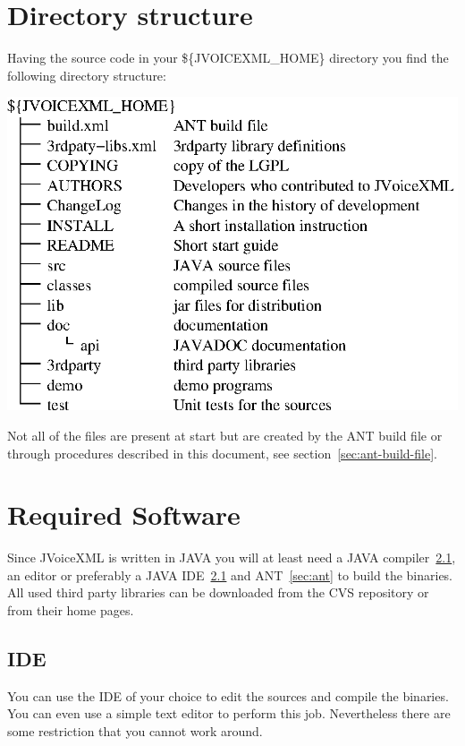 \documentclass[11pt,a4paper]{article}
\begin{document}
\section{Directory structure}
\label{sec:directory-structure}

Having the source code in your \$\{JVOICEXML\_HOME\} directory you
find the following directory structure:

\begin{center}
\includegraphics{structure.eps}
\end{center}

Not all of the files are present at start but are created by the
ANT build file or through procedures described in this 
document, see section~\ref{sec:ant-build-file}.

\section{Required Software}
\label{sec:required-software}

Since JVoiceXML is written in JAVA you will at least need a
JAVA compiler~\ref{sec:ide}, an editor or preferably a JAVA
IDE~\ref{sec:ide} and ANT~\ref{sec:ant} to build the binaries.
All used third party libraries can be downloaded from the CVS 
repository or from their home pages.

\subsection{IDE}
\label{sec:ide}

You can use the IDE of your choice to edit the sources and compile the 
binaries. You can even use a simple text editor to perform this job.
Nevertheless there are some restriction that you cannot work around.
\end{document}
